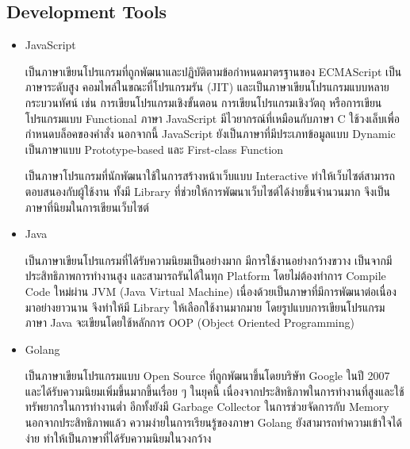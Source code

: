 \documentclass[12pt,oneside,openright,a4paper]{cpe-thai-project}
\begin{document}
  \subsection{Development Tools}
    \begin{itemize}
      \item  JavaScript 
      
        \hspace{1cm}เป็นภาษาเขียนโปรแกรมที่ถูกพัฒนาและปฏิบัติตามข้อกำหนดมาตรฐานของ ECMAScript 
        เป็นภาษาระดับสูง คอมไพล์ในขณะที่โปรแกรมรัน (JIT) 
        และเป็นภาษาเขียนโปรแกรมแบบหลายกระบวนทัศน์ เช่น 
        การเขียนโปรแกรมเชิงขั้นตอน การเขียนโปรแกรมเชิงวัตถุ หรือการเขียนโปรแกรมแบบ Functional 
        ภาษา JavaScript มีไวยากรณ์ที่เหมือนกับภาษา C ใช้วงเล็บเพื่อกำหนดบล็อคของคำสั่ง 
        นอกจากนี้ JavaScript ยังเป็นภาษาที่มีประเภทข้อมูลแบบ Dynamic 
        เป็นภาษาแบบ Prototype-based และ First-class Function  \cite{js} 
        
        \hspace{1cm}เป็นภาษาโปรแกรมที่นักพัฒนาใช้ในการสร้างหน้าเว็บแบบ Interactive 
        ทำให้เว็บไซต์สามารถตอบสนองกับผู้ใช้งาน 
        ทั้งมี Library ที่ช่วยให้การพัฒนาเว็บไซต์ได้ง่ายขึ้นจำนวนมาก 
        จึงเป็นภาษาที่นิยมในการเขียนเว็บไซต์
      \item Java
      
        \hspace{1cm}เป็นภาษาเขียนโปรแกรมที่ได้รับความนิยมเป็นอย่างมาก มีการใช้งานอย่างกว้างขวาง เป็นจากมีประสิทธิภาพการทำงานสูง และสามารถรันได้ในทุก Platform 
        โดยไม่ต้องทำการ Compile Code ใหม่ผ่าน JVM (Java Virtual Machine) เนื่องด้วยเป็นภาษาที่มีการพัฒนาต่อเนื่องมาอย่างยาวนาน 
        จึงทำให้มี Library ให้เลือกใช้งานมากมาย โดยรูปแบบการเขียนโปรแกรมภาษา Java จะเขียนโดยใช้หลักการ OOP (Object Oriented Programming) \cite{java}
      \item  Golang
      
      \hspace{1cm}เป็นภาษาเขียนโปรแกรมแบบ Open Source ที่ถูกพัฒนาขึ้นโดยบริษัท Google ในปี 2007 
      และได้รับความนิยมเพิ่มขึ้นมากขึ้นเรื่อย ๆ ในยุคนี้ \cite{go} เนื่องจากประสิทธิภาพในการทำงานที่สูงและใช้ทรัพยากรในการทำงานต่ำ 
      อีกทั้งยังมี Garbage Collector ในการช่วยจัดการกับ Memory 
      นอกจากประสิทธิภาพแล้ว ความง่ายในการเรียนรู้ของภาษา Golang 
      ยังสามารถทำความเข้าใจได้ง่าย ทำให้เป็นภาษาที่ได้รับความนิยมในวงกว้าง 
      

\end{itemize}
\end{document}
